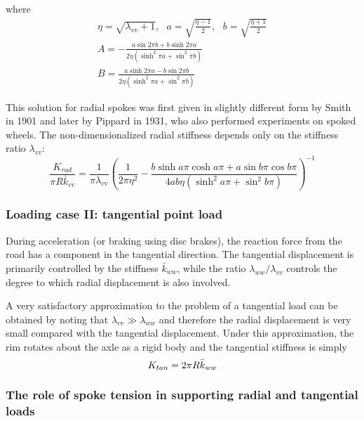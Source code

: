 \documentclass[\rootdir/thesis.tex]{subfiles}
\begin{document}
where
\begin{gather*}
\eta=\sqrt{\lambda_{vv} + 1}, \,\,\,\, a=\sqrt{\frac{\eta-1}{2}}, \,\,\,\, b=\sqrt{\frac{\eta+1}{2}}\\
A = -\frac{a\sin{2\pi b} + b\sinh{2\pi a}}{2\eta(\sinh^2{\pi a} + \sin^2{\pi b})}\\
B =  \frac{a\sinh{2\pi a} - b\sin{2\pi b}}{2\eta(\sinh^2{\pi a} + \sin^2{\pi b})}
\end{gather*}

This solution for radial spokes was first given in slightly different form by Smith\cite{Smith} in 1901 and later by Pippard\cite{Pippard} in 1931, who also performed experiments on spoked wheels. The non-dimensionalized radial stiffness depends only on the stiffness ratio $\lambda_{vv}$:
\begin{equation}
\label{eq:Krad}
\frac{K_{rad}}{\pi R \bar{k}_{vv}} =
    \frac{1}{\pi\lambda_{vv}} \left(\frac{1}{2\pi\eta^2}
                                    -\frac{b\sinh{a\pi}\cosh{a\pi} + a\sin{b\pi}\cos{b\pi}}
                                     {4ab\eta (\sinh^2{a\pi} + \sin^2{b\pi})} \right)^{-1}
\end{equation}

\subsubsection{Loading case II: tangential point load}

During acceleration (or braking using disc brakes), the reaction force from the road has a component in the tangential direction. The tangential displacement is primarily controlled by the stiffness $\bar{k}_{ww}$, while the ratio $\lambda_{ww}/\lambda_{vv}$ controls the degree to which radial displacement is also involved.

A very satisfactory approximation to the problem of a tangential load can be obtained by noting that $\lambda_{vv}\gg\lambda_{ww}$ and therefore the radial displacement is very small compared with the tangential displacement. Under this approximation, the rim rotates about the axle as a rigid body and the tangential stiffness is simply
\begin{equation}
\label{eq:Ktan}
K_{tan} = 2\pi R \bar{k}_{ww}
\end{equation}

\subsubsection{The role of spoke tension in supporting radial and tangential loads}
\end{document}
